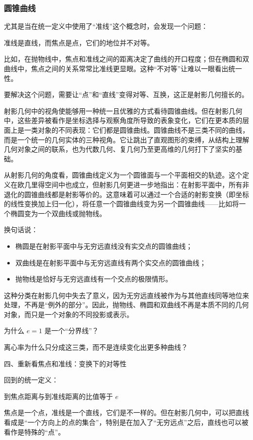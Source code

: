 \subsubsection{圆锥曲线}


尤其是当在统一定义中使用了“准线”这个概念时，会发现一个问题：

准线是直线，而焦点是点，它们的地位并不对等。

比如，在抛物线中，焦点和准线之间的距离决定了曲线的开口程度；但在椭圆和双曲线中，焦点之间的关系常常比准线更显眼。这种“不对等”让难以一眼看出统一性。

要解决这个问题，需要让“点”和“直线”变得对等、互换，这正是射影几何擅长的。




射影几何中的视角使能够用一种统一且优雅的方式看待圆锥曲线。但在射影几何中，这些差异被看作是坐标选择与观察角度所导致的表象变化，它们在更本质的层面上是一类对象的不同表现：它们都是圆锥曲线。圆锥曲线不是三类不同的曲线，而是一个统一的几何实体的三种视角。它让跳出了直观图形的束缚，从结构上理解几何对象之间的联系，也为代数几何、复几何乃至更高维的几何打下了坚实的基础。

从射影几何的角度看，圆锥曲线定义为一个圆锥面与一个平面相交的轨迹。这个定义在欧几里得空间中也成立，但射影几何更进一步地指出：在射影平面中，所有非退化的圆锥曲线都是射影等价的。这意味着可以通过一个合适的射影变换（即坐标的线性变换加上归一化），将任意一个圆锥曲线变为另一个圆锥曲线——比如将一个椭圆变为一个双曲线或抛物线。

换句话说：
\begin{itemize}
\item 椭圆是在射影平面中与无穷远直线没有实交点的圆锥曲线；
\item 双曲线是在射影平面中与无穷远直线有两个实交点的圆锥曲线；
\item 抛物线是恰好与无穷远直线有一个交点的极限情形。
\end{itemize}

这种分类在射影几何中失去了意义，因为无穷远直线被作为与其他直线同等地位来处理，不再是“例外的部分”。因此，抛物线、椭圆和双曲线不再是本质不同的几何对象，而只是一个对象的不同投影或表示。


为什么 $e=1$ 是一个“分界线”？

离心率为什么只分成这三类，而不是连续变化出更多种曲线？

四、重新看焦点和准线：变换下的对等性

回到的统一定义：

到焦点距离与到准线距离的比值等于 $e$

焦点是一个点，准线是一个直线，它们是不一样的。但在射影几何中，可以把直线看成是“一个方向上的点的集合”，特别是在加入了“无穷远点”之后，直线也可以被看作是特殊的“点”。

